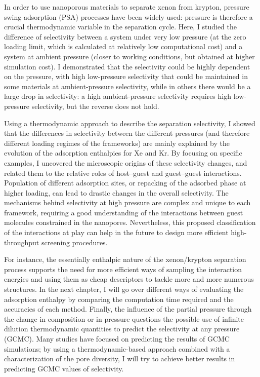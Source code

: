 \documentclass[main.tex]{subfiles}
\begin{document}
In order to use nanoporous materials to separate xenon from krypton, pressure swing adsorption (PSA) processes have been widely used: pressure is therefore a crucial thermodynamic variable in the separation cycle. Here, I studied the difference of selectivity between a system under very low pressure (at the zero loading limit, which is calculated at relatively low computational cost) and a system at ambient pressure (closer to working conditions, but obtained at higher simulation cost). I demonstrated that the selectivity could be highly dependent on the pressure, with high low-pressure selectivity that could be maintained in some materials at ambient-pressure selectivity, while in others there would be a large drop in selectivity: a high ambient-pressure selectivity requires high low-pressure selectivity, but the reverse does not hold.

Using a thermodynamic approach to describe the separation selectivity, I showed that the differences in selectivity between the different pressures (and therefore different loading regimes of the frameworks) are mainly explained by the evolution of the adsorption enthalpies for Xe and Kr. By focusing on specific examples, I uncovered the microscopic origins of these selectivity changes, and related them to the relative roles of host--guest and guest--guest interactions. Population of different adsorption sites, or repacking of the adsorbed phase at higher loading, can lead to drastic changes in the overall selectivity. The mechanisms behind selectivity at high pressure are complex and unique to each framework, requiring a good understanding of the interactions between guest molecules constrained in the nanopores. Nevertheless, this proposed classification of the interactions at play can help in the future to design more efficient high-throughput screening procedures.

For instance, the essentially enthalpic nature of the xenon/krypton separation process supports the need for more efficient ways of sampling the interaction energies and using them as cheap descriptors to tackle more and more numerous structures. In the next chapter, I will go over different ways of evaluating the adsorption enthalpy by comparing the computation time required and the accuracies of each method. Finally, the influence of the partial pressure through the change in composition or in pressure questions the possible use of infinite dilution thermodynamic quantities to predict the selectivity at any pressure (GCMC). Many studies have focused on predicting the results of GCMC simulations;\autocite{Simon_2015,Shi_2023,Kang_2023,Li_2023} by using a thermodynamic-based approach combined with a characterization of the pore diversity, I will try to achieve better results in predicting GCMC values of selectivity.


\OnlyInSubfile{\printglobalbibliography}
\end{document}
